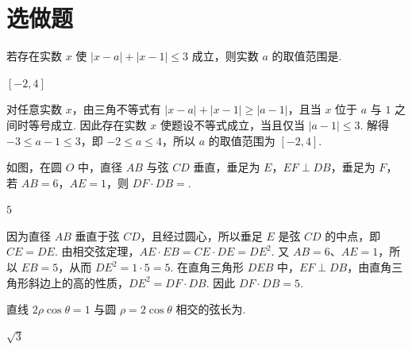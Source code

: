 \section{选做题}

\begin{problem}[A]
若存在实数 \(x\) 使 \( |x - a| + |x - 1| \leqslant 3 \) 成立，则实数 \(a\) 的取值范围是\fillinblank{}.
\end{problem}

\begin{answer}
\([-2,4]\)
\end{answer}

\begin{solution}
对任意实数 \(x\)，由三角不等式有 \(|x-a|+|x-1|\geqslant|a-1|\)，且当 \(x\) 位于 \(a\) 与 \(1\) 之间时等号成立. 因此存在实数 \(x\) 使题设不等式成立，当且仅当 \(|a-1|\leqslant3\). 解得 \(-3\leqslant a-1\leqslant3\)，即 \(-2\leqslant a\leqslant4\)，所以 \(a\) 的取值范围为 \([-2,4]\).
\end{solution}

\reuseproblemnumber
\begin{problem}[B]
如图，在圆 \(O\) 中，直径 \(AB\) 与弦 \(CD\) 垂直，垂足为 \(E\)，\(EF \perp DB\)，垂足为 \(F\)，若 \(AB = 6\)，\(AE = 1\)，则 \(DF \cdot DB = \)\fillinblank{}.

\begin{minipage}{\linewidth}
\centering
{}
\end{minipage}
\end{problem}

\begin{answer}
\(5\)
\end{answer}

\begin{solution}
因为直径 \(AB\) 垂直于弦 \(CD\)，且经过圆心，所以垂足 \(E\) 是弦 \(CD\) 的中点，即 \(CE=DE\). 由相交弦定理，\(AE\cdot EB=CE\cdot DE=DE^2\). 又 \(AB=6\)、\(AE=1\)，所以 \(EB=5\)，从而 \(DE^2=1\cdot5=5\). 在直角三角形 \(DEB\) 中，\(EF\perp DB\)，由直角三角形斜边上的高的性质，\(DE^2=DF\cdot DB\). 因此 \(DF\cdot DB=5\).
\end{solution}

\reuseproblemnumber
\begin{problem}[C]
直线 \(2\rho \cos \theta = 1\) 与圆 \(\rho = 2\cos \theta\) 相交的弦长为\fillinblank{}.
\end{problem}

\begin{answer}
\(\sqrt{3}\)
\end{answer}

